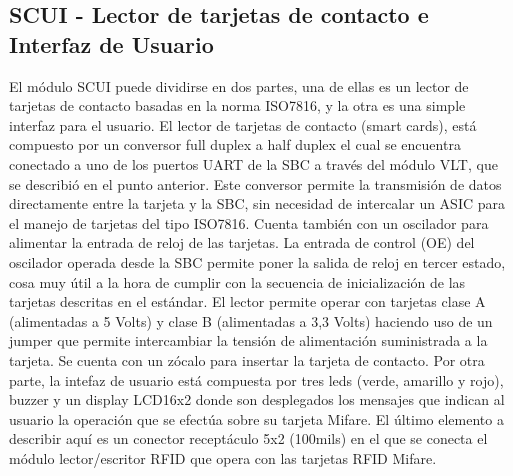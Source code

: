 \subsection{SCUI - Lector de tarjetas de contacto e Interfaz de Usuario}
El módulo SCUI puede dividirse en dos partes, una de ellas es un lector de tarjetas de contacto basadas en la norma ISO7816, y la otra es una simple interfaz para el usuario.
El lector de tarjetas de contacto (smart cards), está compuesto por un conversor full duplex a half duplex el cual se encuentra conectado a uno de los puertos UART de la SBC a través del módulo VLT, que se describió en el punto anterior. Este conversor permite la transmisión de datos directamente entre la tarjeta y la SBC, sin necesidad de intercalar un ASIC para el manejo de tarjetas del tipo ISO7816. Cuenta también con un oscilador para alimentar la entrada de reloj de las tarjetas. La entrada de control (OE) del oscilador operada desde la SBC permite poner la salida de reloj en tercer estado, cosa muy útil a la hora de cumplir con la secuencia de inicialización de las tarjetas descritas en el estándar. El lector permite operar con tarjetas clase A (alimentadas a 5 Volts) y clase B (alimentadas a 3,3 Volts) haciendo uso de un jumper que permite intercambiar la tensión de alimentación suministrada a la tarjeta. Se cuenta con un zócalo para insertar la tarjeta de contacto.
Por otra parte, la intefaz de usuario está compuesta por tres leds (verde, amarillo y rojo), buzzer y un display LCD16x2 donde son desplegados los mensajes que indican al usuario la operación que se efectúa sobre su tarjeta Mifare.
El último elemento a describir aquí es un conector receptáculo 5x2 (100mils) en el que se conecta el módulo lector/escritor RFID que opera con las tarjetas RFID Mifare.

